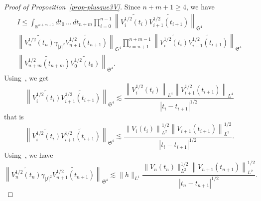 \documentclass[AHL, Unicode, longabstracts,published]{cedram}
\newcommand{\R}{\mathbb{R}}
\newcommand{\frkS}{\mathfrak{S}}
\begin{document}
\begin{proof}[Proof of Proposition~\ref{prop-plusque3V}]
Since $n+m+1 \geq 4$, we have
\begin{multline*}
I \leq \int_{\R^{n+m+1}} dt_0\,\hdots\,dt_{n+m} \prod_{i=0}^{n-1} \left\|\widetilde{V_i^{1/2}(t_i)}\widetilde{V_{i+1}^{1/2}\left(t_{i+1}\right)} \right\|_{\frkS^{4}}\\
\left\|\widetilde{V_n^{1/2}(t_n)} \gamma_{|f|^2} \widetilde{V_{n+1}^{1/2}\left(t_{n+1}\right)} \right\|_{\frkS^{4}} \prod_{i=n+1}^{n+m-1}\left\| \widetilde{V_i^{1/2}(t_i)} \widetilde{V_{i+1}^{1/2}\left(t_{i+1}\right)} \right\|_{\frkS^{4}}\\\left\| \widetilde{V_{n+m}^{1/2}\left(t_{n+m}\right)} \widetilde {V_0^{1/2}(t_0)} \right\|_{\frkS^{4}}.
\end{multline*}
Using~\cite[Lemma~1 p~10]{FLLS}, we get
\[
\left\|\widetilde{V_i^{1/2}(t_i)}\widetilde{V_{i+1}^{1/2}\left(t_{i+1}\right)} \right\|_{\frkS^{4}} \lesssim \frac{\left\|V_i^{1/2}(t_i)\right\|_{L^4} \left\|V_{i+1}^{1/2}\left(t_{i+1}\right)\right\|_{L^4}}{\left|t_i-t_{i+1}\right|^{1/2}}
\]
that is
\[
\left\|\widetilde{V_i^{1/2}(t_i)}\widetilde{V_{i+1}^{1/2}\left(t_{i+1}\right)} \right\|_{\frkS^{4}} \lesssim \frac{\left\|V_i(t_i)\right\|_{L^2}^{1/2} \left\|V_{i+1}\left(t_{i+1}\right)\right\|_{L^2}^{1/2}}{\left|t_i-t_{i+1}\right|^{1/2}}.
\]
Using~\cite[Lemma~4 p~18]{lewsab2}, we have
\[
\left\|\widetilde{V_n^{1/2}(t_n)} \gamma_{|f|^2} \widetilde{V_{n+1}^{1/2}\left(t_{n+1}\right)} \right\|_{\frkS^{4}} \lesssim \|h\|_{L^1}\frac{\|V_n(t_n)\|_{L^2}^{1/2}\left\|V_{n+1}\left(t_{n+1}\right)\right\|_{L^2}^{1/2}}{\left|t_n - t_{n+1}\right|^{1/2}}.
\]


\end{proof}
\end{document}
